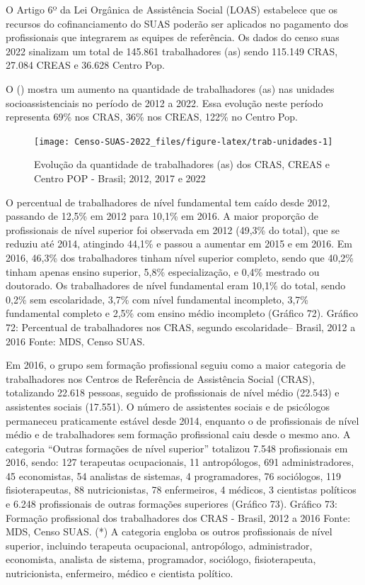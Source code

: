 \documentclass[
  brazilian]{report}
\begin{document}
O Artigo 6º da Lei Orgânica de Assistência Social (LOAS) estabelece que
os recursos do cofinanciamento do SUAS poderão ser aplicados no
pagamento dos profissionais que integrarem as equipes de referência. Os
dados do censo suas 2022 sinalizam um total de 145.861 trabalhadores
(as) sendo 115.149 CRAS, 27.084 CREAS e 36.628 Centro Pop.

O () mostra um aumento na quantidade de
trabalhadores (as) nas unidades socioassistenciais no período de 2012 a
2022. Essa evolução neste período representa 69\% nos CRAS, 36\% nos
CREAS, 122\% no Centro Pop.

\begin{figure}
\texttt{[image: Censo-SUAS-2022\_files/figure-latex/trab-unidades-1]} \caption[ Evolução da quantidade de trabalhadores (as) dos CRAS, CREAS e Centro POP - Brasil]{ Evolução da quantidade de trabalhadores (as) dos CRAS, CREAS e Centro POP - Brasil; 2012, 2017 e 2022}\label{fig:trab-unidades}
\end{figure}

O percentual de trabalhadores de nível fundamental tem caído desde 2012,
passando de 12,5\% em 2012 para 10,1\% em 2016. A maior proporção de
profissionais de nível superior foi observada em 2012 (49,3\% do total),
que se reduziu até 2014, atingindo 44,1\% e passou a aumentar em 2015 e
em 2016. Em 2016, 46,3\% dos trabalhadores tinham nível superior
completo, sendo que 40,2\% tinham apenas ensino superior, 5,8\%
especialização, e 0,4\% mestrado ou doutorado. Os trabalhadores de nível
fundamental eram 10,1\% do total, sendo 0,2\% sem escolaridade, 3,7\%
com nível fundamental incompleto, 3,7\% fundamental completo e 2,5\% com
ensino médio incompleto (Gráfico 72). Gráfico 72: Percentual de
trabalhadores nos CRAS, segundo escolaridade-- Brasil, 2012 a 2016
Fonte: MDS, Censo SUAS.

Em 2016, o grupo sem formação profissional seguiu como a maior categoria
de trabalhadores nos Centros de Referência de Assistência Social (CRAS),
totalizando 22.618 pessoas, seguido de profissionais de nível médio
(22.543) e assistentes sociais (17.551). O número de assistentes sociais
e de psicólogos permaneceu praticamente estável desde 2014, enquanto o
de profissionais de nível médio e de trabalhadores sem formação
profissional caiu desde o mesmo ano. A categoria ``Outras formações de
nível superior'' totalizou 7.548 profissionais em 2016, sendo: 127
terapeutas ocupacionais, 11 antropólogos, 691 administradores, 45
economistas, 54 analistas de sistemas, 4 programadores, 76 sociólogos,
119 fisioterapeutas, 88 nutricionistas, 78 enfermeiros, 4 médicos, 3
cientistas políticos e 6.248 profissionais de outras formações
superiores (Gráfico 73). Gráfico 73: Formação profissional dos
trabalhadores dos CRAS - Brasil, 2012 a 2016 Fonte: MDS, Censo SUAS. (*)
A categoria engloba os outros profissionais de nível superior, incluindo
terapeuta ocupacional, antropólogo, administrador, economista, analista
de sistema, programador, sociólogo, fisioterapeuta, nutricionista,
enfermeiro, médico e cientista político.
\end{document}

